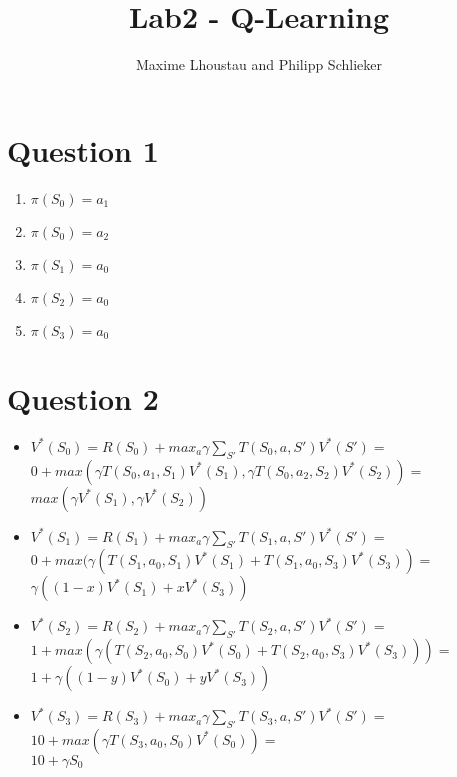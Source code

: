 \documentclass[12pt]{article}
\begin{document}
\title{Lab2 - Q-Learning}
\author{Maxime Lhoustau and Philipp Schlieker}
\maketitle


\section*{Question 1}
\begin{enumerate}
\item $\pi(S_0) = a_1$
\item $\pi(S_0) = a_2$
\item $\pi(S_1) = a_0$
\item $\pi(S_2) = a_0$
\item $\pi(S_3) = a_0$ 
\end{enumerate}
\section*{Question 2}
\begin{itemize}
\item $V^{*}(S_0) = R(S_0)+max_a \gamma \sum_{S'}T(S_0,a,S')V^{*}(S') =$\\$0 + max(\gamma T(S_0, a_1, S_1)V^{*}(S_1), \gamma T(S_0, a_2, S_2)V^{*}(S_2)) =$\\$ max(\gamma V^{*}(S_1), \gamma V^{*}(S_2))$
\item $V^{*}(S_1) = R(S_1)+max_a \gamma \sum_{S'}T(S_1,a,S')V^{*}(S') =$\\
$0 + max(\gamma (T(S_1, a_0, S_1)V^{*}(S_1) + T(S_1, a_0, S_3)V^{*}(S_3)) =$\\
$\gamma ((1-x)V^{*}(S_1) + xV^{*}(S_3))$
\item $V^{*}(S_2) = R(S_2)+max_a \gamma \sum_{S'}T(S_2,a,S')V^{*}(S') =$\\
$1 + max(\gamma (T(S_2, a_0, S_0)V^{*}(S_0) + T(S_2, a_0, S_3)V^{*}(S_3))) =$\\
$1 + \gamma ((1-y)V^{*}(S_0) + yV^{*}(S_3))$
\item $V^{*}(S_3) = R(S_3)+max_a \gamma \sum_{S'}T(S_3,a,S')V^{*}(S') =$\\
$10 + max(\gamma T(S_3, a_0, S_0)V^{*}(S_0)) =$\\
$10 + \gamma S_0$
\end{itemize}
\end{document}
